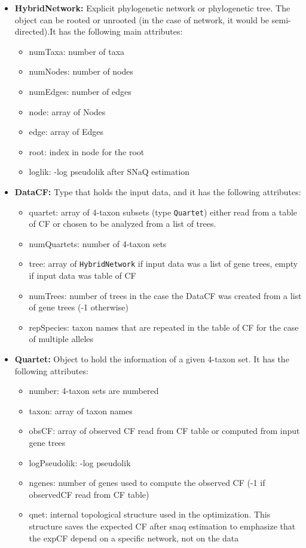 \documentclass[12pt]{article}
\begin{document}
\begin{itemize}
\item{\textbf{HybridNetwork:} Explicit phylogenetic network or
    phylogenetic tree. The object can be rooted or unrooted (in the
    case of network, it would be semi-directed).It has the following
    main attributes:
\begin{itemize}
\item{numTaxa: number of taxa}
\item{numNodes: number of nodes}
\item{numEdges: number of edges}
\item{node: array of Nodes}
\item{edge: array of Edges}
\item{root: index in node for the root}
\item{loglik: -log pseudolik after SNaQ estimation}
\end{itemize}
}
\item{\textbf{DataCF:} Type that holds the input data, and it has the following
  attributes:
\begin{itemize}
\item{quartet: array of 4-taxon subsets (type \texttt{Quartet}) either read from a table of CF
  or chosen to be analyzed from a list of trees.}
\item{numQuartets: number of 4-taxon sets}
\item{tree: array of \texttt{HybridNetwork} if input data was a list of gene
    trees, empty if input data was table of CF}
\item{numTrees: number of trees in the case the DataCF was created
    from a list of gene trees (-1 otherwise)}
\item{repSpecies: taxon names that are repeated in the table of CF for
  the case of multiple alleles}
\end{itemize}
}
\item{\textbf{Quartet:} Object to hold the information of a given 4-taxon
    set. It has the following attributes:
\begin{itemize}
\item{number: 4-taxon sets are numbered}
\item{taxon: array of taxon names}
\item{obsCF: array of observed CF read from CF table or computed from
    input gene trees}
\item{logPseudolik: -log pseudolik}
\item{ngenes: number of genes used to compute the observed CF (-1 if
    observedCF read from CF table)}
\item{qnet: internal topological structure used in the
    optimization. This structure saves the expected CF after snaq
    estimation to emphasize that the expCF depend on a specific
    network, not on the data}
\end{itemize}
}
\end{itemize}
\end{document}
